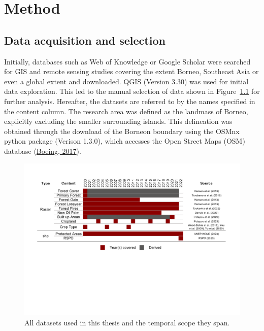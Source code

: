 \documentclass[
  letterpaper,
  DIV=11,
  numbers=noendperiod]{scrreprt}
\begin{document}
\hypertarget{sec-method}{%
\chapter{Method}\label{sec-method}}

\hypertarget{data-acquisition-and-selection}{%
\section{Data acquisition and
selection}\label{data-acquisition-and-selection}}

Initially, databases such as Web of Knowledge or Google Scholar were
searched for GIS and remote sensing studies covering the extent Borneo,
Southeast Asia or even a global extent and downloaded. QGIS (Version
3.30) was used for initial data exploration. This led to the manual
selection of data shown in Figure~\ref{fig-data_overview} for further
analysis. Hereafter, the datasets are referred to by the names specified
in the content column. The research area was defined as the landmass of
Borneo, explicitly excluding the smaller surrounding islands. This
delineation was obtained through the download of the Borneon boundary
using the OSMnx python package (Verison 1.3.0), which accesses the Open
Street Maps (OSM) database
(\protect\hyperlink{ref-boeingOSMnxPythonPackage2017}{Boeing, 2017}).

\begin{figure}

{\centering \includegraphics{text/05_method_files/data_overview.pdf}

}

\caption{\label{fig-data_overview}All datasets used in this thesis and
the temporal scope they span.}

\end{figure}
\end{document}
